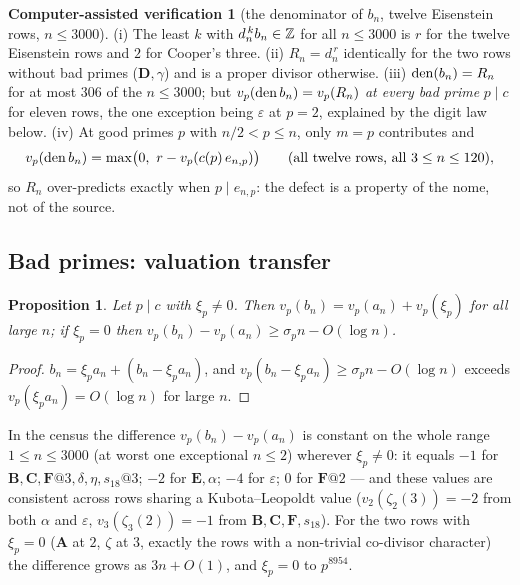 \documentclass[11pt]{amsart}
\newtheorem{proposition}[theorem]{Proposition}
\theoremstyle{definition}
\newtheorem{verification}[theorem]{Computer-assisted verification}
\theoremstyle{remark}
\begin{document}
\begin{verification}[the denominator of $b_n$, twelve Eisenstein rows, $n\le3000$]\label{ver:den}
(i) The least $k$ with $d_n^{\,k}b_n\in\mathbb Z$ for all $n\le3000$ is $r$ for the twelve Eisenstein rows and $2$ for Cooper's three. (ii) $R_n=d_n^{\,r}$ identically for the two rows without bad primes ($\mathbf D,\gamma$) and is a proper divisor otherwise. (iii) $\operatorname{den}(b_n)=R_n$ for at most $306$ of the $n\le3000$; but $v_p(\operatorname{den} b_n)=v_p(R_n)$ \emph{at every bad prime} $p\mid c$ for eleven rows, the one exception being $\varepsilon$ at $p=2$, explained by the digit law below. (iv) At good primes $p$ with $n/2<p\le n$, only $m=p$ contributes and
$$v_p(\den b_n)=\max\bigl(0,\ r-v_p(c(p)\,e_{n,p})\bigr)\qquad(\text{all twelve rows, all }3\le n\le120),$$
so $R_n$ over-predicts exactly when $p\mid e_{n,p}$: the defect is a property of the nome, not of the source.
\end{verification}

\subsection{Bad primes: valuation transfer}
\begin{proposition}\label{prop:transfer}
Let $p\mid c$ with $\xi_p\ne0$. Then $v_p(b_n)=v_p(a_n)+v_p(\xi_p)$ for all large $n$; if $\xi_p=0$ then $v_p(b_n)-v_p(a_n)\ge\sigma_pn-O(\log n)$.
\end{proposition}
\begin{proof} $b_n=\xi_pa_n+(b_n-\xi_pa_n)$, and $v_p(b_n-\xi_pa_n)\ge\sigma_pn-O(\log n)$ exceeds $v_p(\xi_pa_n)=O(\log n)$ for large $n$.\end{proof}
In the census the difference $v_p(b_n)-v_p(a_n)$ is constant on the whole range $1\le n\le3000$ (at worst one exceptional $n\le2$) wherever $\xi_p\ne0$: it equals $-1$ for $\mathbf B,\mathbf C,\mathbf F{@}3,\delta,\eta,s_{18}{@}3$; $-2$ for $\mathbf E,\alpha$; $-4$ for $\varepsilon$; $0$ for $\mathbf F{@}2$ — and these values are consistent across rows sharing a Kubota--Leopoldt value ($v_2(\zeta_2(3))=-2$ from both $\alpha$ and $\varepsilon$, $v_3(\zeta_3(2))=-1$ from $\mathbf B,\mathbf C,\mathbf F,s_{18}$). For the two rows with $\xi_p=0$ ($\mathbf A$ at $2$, $\zeta$ at $3$, exactly the rows with a non-trivial co-divisor character) the difference grows as $3n+O(1)$, and $\xi_p=0$ to $p^{8954}$.
\end{document}
